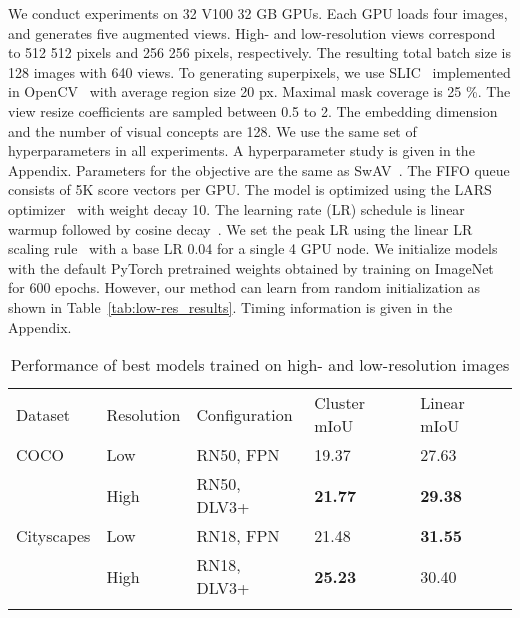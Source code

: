 \documentclass{bmvc2k}
\begin{document}
We conduct experiments on 32 V100 32 GB GPUs. Each GPU loads four images, and generates five augmented views. High- and low-resolution views correspond to 512  512 pixels and 256  256 pixels, respectively. The resulting total batch size is 128 images with 640 views. To generating superpixels, we use SLIC~\cite{Achanta2010SLICSuperpixels} implemented in OpenCV~\cite{Bradski2000OpenCV} with average region size 20 px. Maximal mask coverage is 25 \%. The view resize coefficients  are sampled between 0.5 to 2. The embedding dimension  and the number of visual concepts  are 128. We use the same set of hyperparameters in all experiments. A hyperparameter study is given in the Appendix.
Parameters for the objective  are the same as SwAV~\cite{Caron2020SwAV}. The FIFO queue consists of 5K score vectors  per GPU. The model is optimized using the LARS optimizer~\cite{You2017LARS} with weight decay 10. The learning rate (LR) schedule is linear warmup followed by cosine decay~\cite{Loshchilov2017SGDRSG, Misra2020PretextInvRepr}. We set the peak LR using the linear LR scaling rule~\cite{Goyal2017ImageNet1H} with a base LR 0.04 for a single 4 GPU node. We initialize models with the default PyTorch pretrained weights obtained by training on ImageNet~\cite{Deng2009ImageNet} for 600 epochs. However, our method can learn from random initialization as shown in Table~\ref{tab:low-res_results}. Timing information is given in the Appendix.

\setlength{\tabcolsep}{4pt}
\begin{table}
\begin{center}
\caption{Performance of best models trained on high- and low-resolution images}
\begin{tabular}{lllll}
\hline\noalign{\smallskip}
Dataset & Resolution & Configuration & Cluster mIoU & Linear mIoU \\
\noalign{\smallskip}\hline
COCO & Low  & RN50, FPN & 19.37 & 27.63 \\
     & High & RN50, DLV3+ & \textbf{21.77} & \textbf{29.38} \\ \noalign{\smallskip}\hline\noalign{\smallskip}
Cityscapes & Low  & RN18, FPN & 21.48 & \textbf{31.55} \\
           & High & RN18, DLV3+ & \textbf{25.23} & 30.40 \\
\hline
\label{tab:high_low_res}
\end{tabular}
\end{center}
\end{table}
\setlength{\tabcolsep}{1.4pt}
\end{document}
